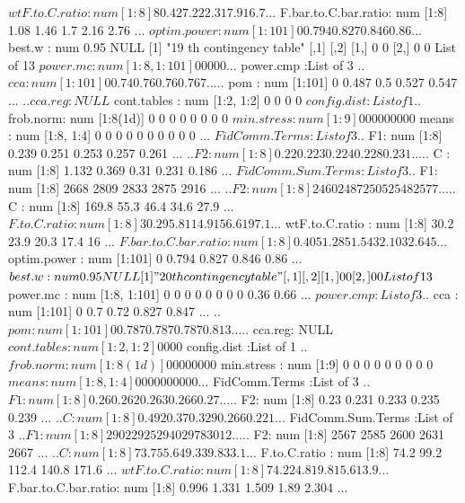 \documentclass[11pt]{article} %
\begin{document}
\begin{Schunk}
\begin{Soutput}
 $ wtF.to.C.ratio      : num [1:8] 80.4 27.2 22.3 17.9 16.7 ...
 $ F.bar.to.C.bar.ratio: num [1:8] 1.08 1.46 1.7 2.16 2.76 ...
 $ optim.power         : num [1:101] 0 0.794 0.827 0.846 0.86 ...
 $ best.w              : num 0.95
NULL
[1] "19 th contingency table"
     [,1] [,2]
[1,]    0    0
[2,]    0    0
List of 13
 $ power.mc            : num [1:8, 1:101] 0 0 0 0 0 ...
 $ power.cmp           :List of 3
  ..$ cca    : num [1:101] 0 0.74 0.76 0.76 0.767 ...
  ..$ pom    : num [1:101] 0 0.487 0.5 0.527 0.547 ...
  ..$ cca.reg: NULL
 $ cont.tables         : num [1:2, 1:2] 0 0 0 0
 $ config.dist         :List of 1
  ..$ frob.norm: num [1:8(1d)] 0 0 0 0 0 0 0 0
 $ min.stress          : num [1:9] 0 0 0 0 0 0 0 0 0
 $ means               : num [1:8, 1:4] 0 0 0 0 0 0 0 0 0 0 ...
 $ FidComm.Terms       :List of 3
  ..$ F1: num [1:8] 0.239 0.251 0.253 0.257 0.261 ...
  ..$ F2: num [1:8] 0.22 0.223 0.224 0.228 0.231 ...
  ..$ C : num [1:8] 1.132 0.369 0.31 0.231 0.186 ...
 $ FidComm.Sum.Terms   :List of 3
  ..$ F1: num [1:8] 2668 2809 2833 2875 2916 ...
  ..$ F2: num [1:8] 2460 2487 2505 2548 2577 ...
  ..$ C : num [1:8] 169.8 55.3 46.4 34.6 27.9 ...
 $ F.to.C.ratio        : num [1:8] 30.2 95.8 114.9 156.6 197.1 ...
 $ wtF.to.C.ratio      : num [1:8] 30.2 23.9 20.3 17.4 16 ...
 $ F.bar.to.C.bar.ratio: num [1:8] 0.405 1.285 1.543 2.103 2.645 ...
 $ optim.power         : num [1:101] 0 0.794 0.827 0.846 0.86 ...
 $ best.w              : num 0.95
NULL
[1] "20 th contingency table"
     [,1] [,2]
[1,]    0    0
[2,]    0    0
List of 13
 $ power.mc            : num [1:8, 1:101] 0 0 0 0 0 0 0 0 0.36 0.66 ...
 $ power.cmp           :List of 3
  ..$ cca    : num [1:101] 0 0.7 0.72 0.827 0.847 ...
  ..$ pom    : num [1:101] 0 0.787 0.787 0.787 0.813 ...
  ..$ cca.reg: NULL
 $ cont.tables         : num [1:2, 1:2] 0 0 0 0
 $ config.dist         :List of 1
  ..$ frob.norm: num [1:8(1d)] 0 0 0 0 0 0 0 0
 $ min.stress          : num [1:9] 0 0 0 0 0 0 0 0 0
 $ means               : num [1:8, 1:4] 0 0 0 0 0 0 0 0 0 0 ...
 $ FidComm.Terms       :List of 3
  ..$ F1: num [1:8] 0.26 0.262 0.263 0.266 0.27 ...
  ..$ F2: num [1:8] 0.23 0.231 0.233 0.235 0.239 ...
  ..$ C : num [1:8] 0.492 0.37 0.329 0.266 0.221 ...
 $ FidComm.Sum.Terms   :List of 3
  ..$ F1: num [1:8] 2902 2925 2940 2978 3012 ...
  ..$ F2: num [1:8] 2567 2585 2600 2631 2667 ...
  ..$ C : num [1:8] 73.7 55.6 49.3 39.8 33.1 ...
 $ F.to.C.ratio        : num [1:8] 74.2 99.2 112.4 140.8 171.6 ...
 $ wtF.to.C.ratio      : num [1:8] 74.2 24.8 19.8 15.6 13.9 ...
 $ F.bar.to.C.bar.ratio: num [1:8] 0.996 1.331 1.509 1.89 2.304 ...

\end{Soutput}
\end{Schunk}
\end{document}
